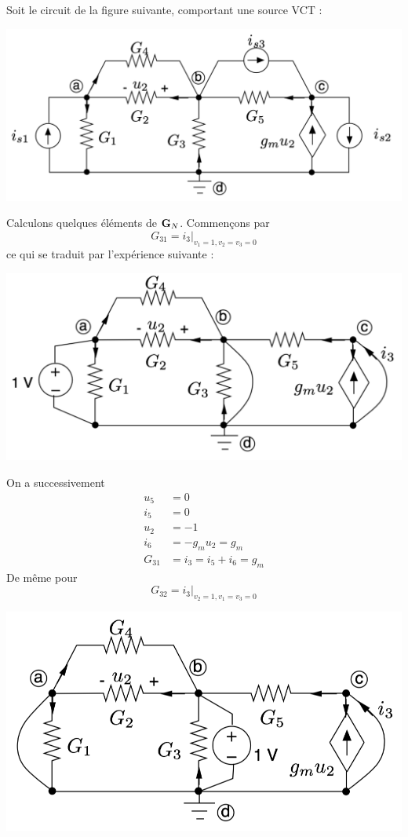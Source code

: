 \begin{testexample}
Soit le circuit de la figure suivante, comportant une source VCT :
\begin{center}
	\includegraphics[width=0.7\linewidth]{figs/methodes-generales/ex_exp_0}
\end{center}
Calculons quelques éléments de ${\bf G}_N$. Commençons par 
\[G_{31}=i_{3}|_{v_{1}=1,v_{2}=v_{3}=0}\]
ce qui se traduit par l'expérience suivante : 
\begin{center}
\includegraphics[width=0.7\linewidth]{figs/methodes-generales/ex_exp_1}
\end{center}
On a successivement 
\begin{align*}
u_5&=0 \\
i_5&=0 \\
u_2&=-1 \\
i_6&=-g_mu_2=g_m \\
G_{31} &= i_{3}= i_5+i_6=g_m
\end{align*}
De même pour \[G_{32}=i_{3}|_{v_{2}=1,v_{1}=v_{3}=0}\]
\begin{center}
	\includegraphics[width=0.7\linewidth]{figs/methodes-generales/ex_exp_2}
\end{center}

\end{testexample}

